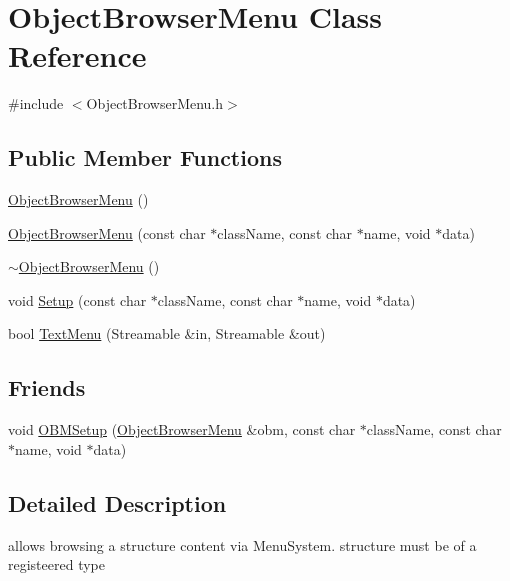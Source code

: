 \hypertarget{classObjectBrowserMenu}{
\section{ObjectBrowserMenu Class Reference}
\label{classObjectBrowserMenu}
}


{\ttfamily \#include $<$ObjectBrowserMenu.h$>$}

\subsection*{Public Member Functions}
\begin{DoxyCompactItemize}
\item 
\hyperlink{classObjectBrowserMenu_af90e1c774fd4cde648f42b6ee71fba7f}{ObjectBrowserMenu} ()
\item 
\hyperlink{classObjectBrowserMenu_a4bfb3035fd0fe20a68c6ba9f381c58cd}{ObjectBrowserMenu} (const char $\ast$className, const char $\ast$name, void $\ast$data)
\item 
\hyperlink{classObjectBrowserMenu_aa8e578d4612584a44ab5ac98b0ca267b}{$\sim$ObjectBrowserMenu} ()
\item 
void \hyperlink{classObjectBrowserMenu_a046c71376b0d989a56ff0e0190a5af83}{Setup} (const char $\ast$className, const char $\ast$name, void $\ast$data)
\item 
bool \hyperlink{classObjectBrowserMenu_ac5e3add42f5d7f84e97f7611c54936ba}{TextMenu} (Streamable \&in, Streamable \&out)
\end{DoxyCompactItemize}
\subsection*{Friends}
\begin{DoxyCompactItemize}
\item 
void \hyperlink{classObjectBrowserMenu_a632b08917ca4c5c5a533dadb6f3ab205}{OBMSetup} (\hyperlink{classObjectBrowserMenu}{ObjectBrowserMenu} \&obm, const char $\ast$className, const char $\ast$name, void $\ast$data)
\end{DoxyCompactItemize}


\subsection{Detailed Description}
allows browsing a structure content via MenuSystem. structure must be of a registeered type 


